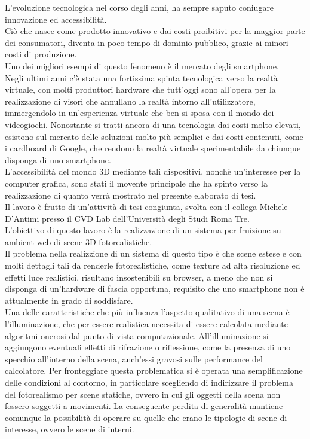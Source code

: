 L’evoluzione tecnologica nel corso degli anni, ha sempre saputo coniugare innovazione ed accessibilità.
\\
Ciò che nasce come prodotto innovativo e dai costi proibitivi per la maggior parte dei consumatori, diventa in poco tempo di dominio pubblico, grazie ai minori costi di produzione.
\\ 
Uno dei migliori esempi di questo fenomeno è il mercato degli smartphone.
\\
Negli ultimi anni c’è stata una fortissima spinta tecnologica verso la realtà virtuale, con molti produttori hardware che tutt’oggi sono all’opera per la realizzazione di visori che annullano la realtà intorno all’utilizzatore, immergendolo in un’esperienza virtuale che ben si sposa con il mondo dei videogiochi. Nonostante si tratti ancora di una tecnologia dai costi molto elevati, esistono sul mercato delle soluzioni molto più semplici e dai costi contenuti, come i cardboard di Google, che rendono la realtà virtuale sperimentabile da chiunque disponga di uno smartphone. 
\\
L’accessibilità del mondo 3D mediante tali dispositivi, nonchè un’interesse per la computer grafica, sono stati il movente principale che ha spinto verso la realizzazione di quanto verrà mostrato nel presente elaborato di tesi.
\\
Il lavoro è frutto di un'attività di tesi congiunta, svolta con il collega Michele D'Antimi presso il CVD Lab dell'Università degli Studi Roma Tre. 
\\
L'obiettivo di questo lavoro è la realizzazione di un sistema per fruizione su ambient web di scene 3D fotorealistiche.
\\
Il problema nella realizzione di un sistema di questo tipo è che scene estese e con molti dettagli tali da renderle fotorealistiche, come texture ad alta risoluzione ed effetti luce realistici, risultano insostenibili su browser, a meno che non si disponga di un'hardware di fascia opportuna, requisito che uno smartphone non è attualmente in grado di soddisfare. 
\\
Una delle caratteristiche che più influenza l’aspetto qualitativo di una scena è l’illuminazione, che per essere realistica necessita di essere calcolata mediante algoritmi onerosi dal punto di vista computazionale. All’illuminazione si aggiungono eventuali effetti di rifrazione o riflessione, come la presenza di uno specchio all’interno della scena, anch’essi gravosi sulle performance del calcolatore.
Per fronteggiare questa problematica si è operata una semplificazione delle condizioni al contorno, in particolare scegliendo di indirizzare il problema del fotorealismo per scene statiche, ovvero in cui gli oggetti della scena non fossero soggetti a movimenti. La conseguente perdita di generalità mantiene comunque la possibilità di operare su quelle che erano le tipologie di scene di interesse, ovvero le scene di interni.
